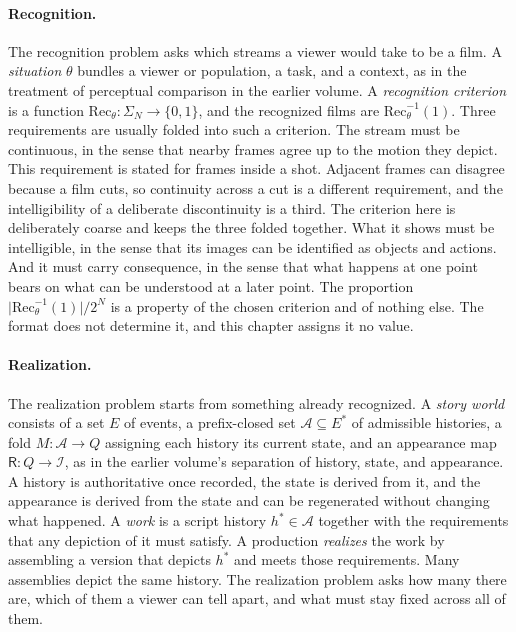 \documentclass[11pt,twoside,openright]{book}
\theoremstyle{plain}
\theoremstyle{definition}
\theoremstyle{remark}
\newcommand{\Img}{\mathcal{I}}      %
\newcommand{\Ren}{\mathsf{R}}       %
\newcommand{\Adm}{\mathcal{A}}      %
\begin{document}
\paragraph{Recognition.} The recognition problem asks which streams a viewer would take to be a film. A \emph{situation} $\theta$ bundles a viewer or population, a task, and a context, as in the treatment of perceptual comparison in the earlier volume. A \emph{recognition criterion} is a function $\mathrm{Rec}_\theta:\Sigma_N\to\{0,1\}$, and the recognized films are $\mathrm{Rec}_\theta^{-1}(1)$. Three requirements are usually folded into such a criterion. The stream must be continuous, in the sense that nearby frames agree up to the motion they depict. This requirement is stated for frames inside a shot. Adjacent frames can disagree because a film cuts, so continuity across a cut is a different requirement, and the intelligibility of a deliberate discontinuity is a third. The criterion here is deliberately coarse and keeps the three folded together. What it shows must be intelligible, in the sense that its images can be identified as objects and actions. And it must carry consequence, in the sense that what happens at one point bears on what can be understood at a later point. The proportion $\lvert\mathrm{Rec}_\theta^{-1}(1)\rvert/2^N$ is a property of the chosen criterion and of nothing else. The format does not determine it, and this chapter assigns it no value.

\paragraph{Realization.} The realization problem starts from something already recognized. A \emph{story world} consists of a set $E$ of events, a prefix-closed set $\Adm\subseteq E^*$ of admissible histories, a fold $M:\Adm\to Q$ assigning each history its current state, and an appearance map $\Ren:Q\to\Img$, as in the earlier volume's separation of history, state, and appearance. A history is authoritative once recorded, the state is derived from it, and the appearance is derived from the state and can be regenerated without changing what happened. A \emph{work} is a script history $h^\ast\in\Adm$ together with the requirements that any depiction of it must satisfy. A production \emph{realizes} the work by assembling a version that depicts $h^\ast$ and meets those requirements. Many assemblies depict the same history. The realization problem asks how many there are, which of them a viewer can tell apart, and what must stay fixed across all of them.
\end{document}

